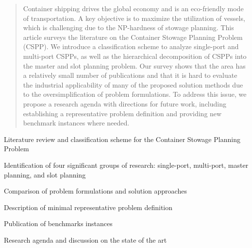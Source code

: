 \documentclass[preprint,12pt,authoryear]{elsarticle}
\begin{document}
\begin{frontmatter}
\begin{abstract}
Container shipping drives the global economy and is an eco-friendly mode of transportation. A key objective is to maximize the utilization of vessels, which is challenging due to the NP-hardness of stowage planning. This article surveys the literature on the Container Stowage Planning Problem (CSPP). We introduce a classification scheme to analyze single-port and multi-port CSPPs, as well as the hierarchical decomposition of CSPPs into the master and slot planning problem. Our survey shows that the area has a relatively small number of publications and that it is hard to evaluate the industrial applicability of many of the proposed solution methods due to the oversimplification of problem formulations. To address this issue, we propose a research agenda with directions for future work, including establishing a representative problem definition and providing new benchmark instances where needed. 

\end{abstract}


\begin{highlights}

\item Literature review and classification scheme for the Container Stowage Planning Problem
\item Identification of four significant groups of research: single-port, multi-port, master planning, and slot planning
\item Comparison of problem formulations and solution approaches
\item Description of minimal representative problem definition
\item Publication of benchmarks instances
\item Research agenda and discussion on the state of the art



\end{highlights}
\end{frontmatter}
\end{document}
